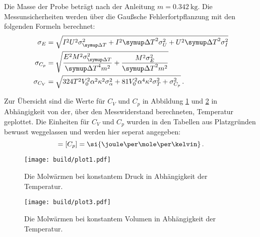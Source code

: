 Die Masse der Probe beträgt nach der Anleitung \cite{V47} $m = \SI{0.342}{\kilo\gram}$.
Die Messunsicherheiten werden über die Gaußsche Fehlerfortpflanzung mit den folgenden Formeln berechnet:
\begin{align*}
	\sigma_E &= \sqrt{I^{2} U^{2} \sigma_{{\symup\Delta T}}^{2} + I^{2} {\symup\Delta T}^{2} \sigma_{U}^{2} + U^{2} {\symup\Delta T}^{2} \sigma_{I}^{2}}\\
	\sigma_{C_p} &= \sqrt{\frac{E^{2} M^{2} \sigma_{{\symup\Delta T}}^{2}}{{\symup\Delta T}^{4} m^{2}} +\frac{M^{2} \sigma_{E}^{2}}{{\symup\Delta T}^{2} m^{2}}}\\
	\sigma_{C_V} &= \sqrt{324 T^{2} V_{0}^{2} \alpha^{2} \kappa^{2} \sigma_{\alpha}^{2} + 81 V_{0}^{2} \alpha^{4} \kappa^{2} \sigma_{T}^{2} + \sigma_{C_{p}}^{2}}\,\text.
\end{align*}

Zur Übersicht sind die Werte für $C_V$ und $C_p$ in Abbildung \ref{fig:cp} und \ref{fig:cv} in Abhängigkeit von der, über den Messwiderstand berechneten, Temperatur geplottet.
Die Einheiten für $C_V$ und $C_p$ wurden in den Tabellen aus Platzgründen bewusst weggelassen und werden hier seperat angegeben:
\begin{equation*}
	[C_V] = [C_p] = \si{\joule\per\mole\per\kelvin}\,\text.
\end{equation*}

\begin{figure}
	\centering
	\texttt{[image: build/plot1.pdf]}
	\caption{Die Molwärmen bei konstantem Druck in Abhängigkeit der Temperatur.}
	\label{fig:cp}
\end{figure}

\begin{figure}
	\centering
	\texttt{[image: build/plot3.pdf]}
	\caption{Die Molwärmen bei konstantem Volumen in Abhängigkeit der Temperatur.}
	\label{fig:cv}
\end{figure}


